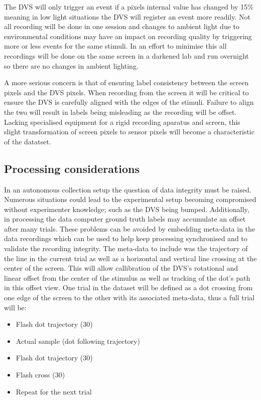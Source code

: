 The DVS will only trigger an event if a pixels internal value has changed by 15\% meaning in low light situations the DVS will register an event more readily. 
Not all recording will be done in one session and changes to ambient light due to environmental conditions may have an impact on recording quality by triggering more or less events for the same stimuli.
In an effort to minimise this all recordings will be done on the same screen in a darkened lab and run overnight so there are no changes in ambient lighting. 

A more serious concern is that of ensuring label consistency between the screen pixels and the DVS pixels. 
When recording from the screen it will be critical to ensure the DVS is carefully aligned with the edges of the stimuli.
Failure to align the two will result in labels being misleading as the recording will be offset.
Lacking specialised equipment for a rigid recording aparatus and screen, this slight transformation of screen pixels to sensor pixels will become a characteristic of the datatset. 

\subsection{Processing considerations}
In an autonomous collection setup the question of data integrity must be raised.
Numerous situations could lead to the experimental setup becoming compromised without experimenter knowledge; such as the DVS being bumped.
Additionally, in processing the data computer ground truth labels may accumulate an offset after many trials.
These problems can be avoided by embedding meta-data in the data recordings which can be used to help keep processing synchronised and to validate the recording integrity. 
The meta-data to include was the trajectory of the line in the current trial as well as a horizontal and vertical line crossing at the center of the screen.
This will allow callibration of the DVS's rotational and linear offset from the center of the stimulus as well as tracking of the dot's path in this offset view. 
One trial in the dataset will be defined as a dot crossing from one edge of the screen to the other with its associated meta-data, thus a full trial will be:

\begin{itemize}
    \itemsep-0.5em
    \item Flash dot trajectory (30\ms)
    \item Actual sample (dot following trajectory)
    \item Flash dot trajectory (30\ms)
    \item Flash cross (30\ms)
    \item Repeat for the next trial
\end{itemize}

